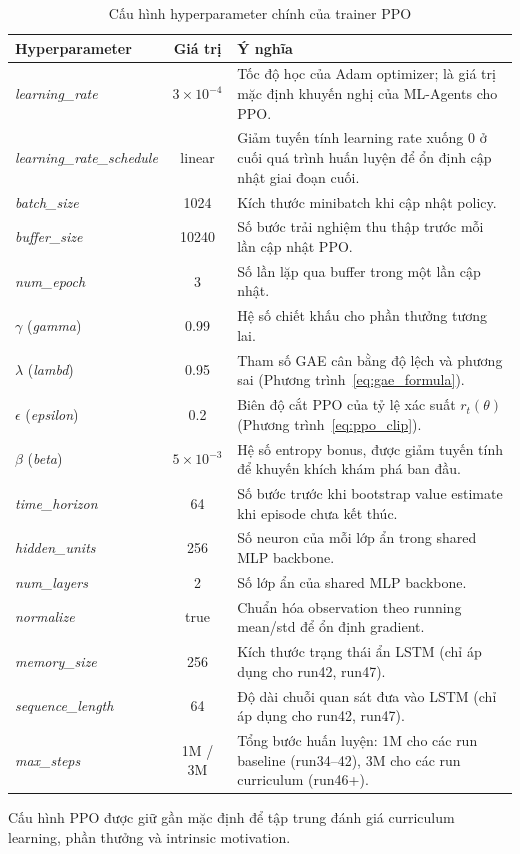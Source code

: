 \begin{table}[H]
    \centering
    \small
    \caption{Cấu hình hyperparameter chính của trainer PPO}
    \label{tab:ppo_hyperparams}
    \begin{tabular}{|p{4.0cm}|c|p{7.2cm}|}
        \hline
        \textbf{Hyperparameter} & \textbf{Giá trị} & \textbf{Ý nghĩa} \\
        \hline
        \emph{learning\_rate}      & $3{\times}10^{-4}$ & Tốc độ học của Adam optimizer; là giá trị mặc định khuyến nghị của ML-Agents cho PPO. \\
        \hline
        \emph{learning\_rate\_schedule} & linear & Giảm tuyến tính learning rate xuống 0 ở cuối quá trình huấn luyện để ổn định cập nhật giai đoạn cuối. \\
        \hline
        \emph{batch\_size}         & 1024  & Kích thước minibatch khi cập nhật policy. \\
        \hline
        \emph{buffer\_size}        & 10240 & Số bước trải nghiệm thu thập trước mỗi lần cập nhật PPO. \\
        \hline
        \emph{num\_epoch}          & 3     & Số lần lặp qua buffer trong một lần cập nhật. \\
        \hline
        $\gamma$ (\emph{gamma})    & 0.99  & Hệ số chiết khấu cho phần thưởng tương lai. \\
        \hline
        $\lambda$ (\emph{lambd})   & 0.95  & Tham số GAE cân bằng độ lệch và phương sai (Phương trình~\ref{eq:gae_formula}). \\
        \hline
        $\epsilon$ (\emph{epsilon})& 0.2   & Biên độ cắt PPO của tỷ lệ xác suất $r_t(\theta)$ (Phương trình~\ref{eq:ppo_clip}). \\
        \hline
        $\beta$ (\emph{beta})      & $5{\times}10^{-3}$ & Hệ số entropy bonus, được giảm tuyến tính để khuyến khích khám phá ban đầu. \\
        \hline
        \emph{time\_horizon}       & 64    & Số bước trước khi bootstrap value estimate khi episode chưa kết thúc. \\
        \hline
        \emph{hidden\_units}       & 256   & Số neuron của mỗi lớp ẩn trong shared MLP backbone. \\
        \hline
        \emph{num\_layers}         & 2     & Số lớp ẩn của shared MLP backbone. \\
        \hline
        \emph{normalize}           & true  & Chuẩn hóa observation theo running mean/std để ổn định gradient. \\
        \hline
        \emph{memory\_size}        & 256   & Kích thước trạng thái ẩn LSTM (chỉ áp dụng cho run42, run47). \\
        \hline
        \emph{sequence\_length}    & 64    & Độ dài chuỗi quan sát đưa vào LSTM (chỉ áp dụng cho run42, run47). \\
        \hline
        \emph{max\_steps}          & 1M / 3M & Tổng bước huấn luyện: 1M cho các run baseline (run34--42), 3M cho các run curriculum (run46+). \\
        \hline
    \end{tabular}
\end{table}

Cấu hình PPO được giữ gần mặc định để tập trung đánh giá curriculum learning, phần thưởng và intrinsic motivation.
